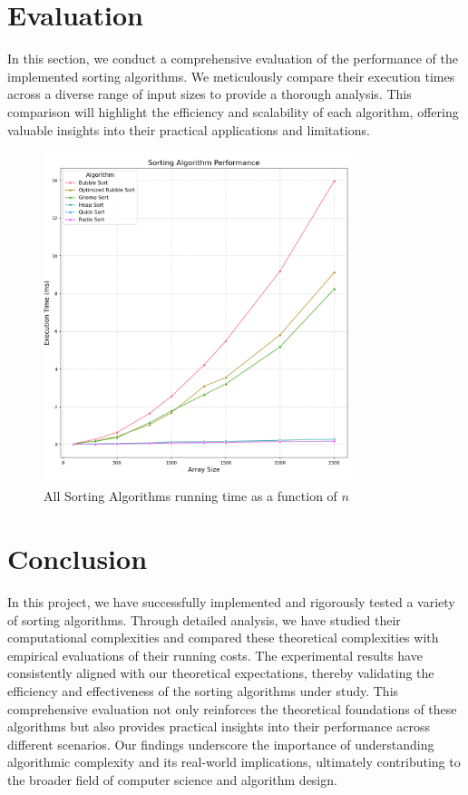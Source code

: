 \documentclass{article}
\begin{document}
\section{Evaluation}
In this section, we conduct a comprehensive evaluation of the performance of the implemented sorting algorithms. We meticulously compare their execution times across a diverse range of input sizes to provide a thorough analysis. This comparison will highlight the efficiency and scalability of each algorithm, offering valuable insights into their practical applications and limitations.

\begin{figure}[H]
	\includegraphics[width=0.8\textwidth]{images/all_sorts.png}
	\caption{All Sorting Algorithms running time as a function of $n$}
\end{figure}

\section{Conclusion}
In this project, we have successfully implemented and rigorously tested a variety of sorting algorithms. Through detailed analysis, we have studied their computational complexities and compared these theoretical complexities with empirical evaluations of their running costs. The experimental results have consistently aligned with our theoretical expectations, thereby validating the efficiency and effectiveness of the sorting algorithms under study. This comprehensive evaluation not only reinforces the theoretical foundations of these algorithms but also provides practical insights into their performance across different scenarios. Our findings underscore the importance of understanding algorithmic complexity and its real-world implications, ultimately contributing to the broader field of computer science and algorithm design.
\end{document}
